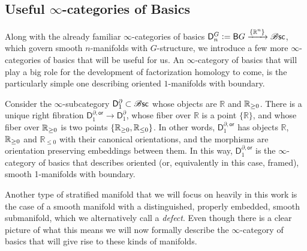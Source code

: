 \documentclass[../text]{subfiles}
\begin{document}
\subsection{Useful \texorpdfstring{$\infty$}{infinite}-categories of Basics}

Along with the already familiar $\infty$-categories of basics $\mathsf{D}_n^{G} := \mathsf{B}G \xrightarrow{\{ \mathbb{R}^n\}} \mathscr{B} \mathsf{sc}$, which govern smooth $n$-manifolds with $G$-structure, we introduce a few more $\infty$-categories of basics that will be useful for us. An $\infty$-category of basics that will play a big role for the development of factorization homology to come, is the particularly simple one describing oriented $1$-manifolds with boundary.

\begin{construction}\label{con:d_1^bor_structure}
    Consider the $\infty$-subcategory $\mathsf{D}_1^{\partial} \subset \mathscr{B} \mathsf{sc}$ whose objects are $\mathbb{R}$ and $\mathbb{R}_{\geq 0}$. There is a unique right fibration $\mathsf{D}_1^{\partial, \mathsf{or}} \rightarrow \mathsf{D}_1^{\partial}$, whose fiber over $\mathbb{R}$ is a point $\{ \mathbb{R}\}$, and whose fiber over $\mathbb{R}_{\geq 0}$ is two points $\{ \mathbb{R}_{\geq 0}, {\mathbb{R}_{\leq 0}} \}$. In other words, $\mathsf{D}_1^{\partial, \mathsf{or}}$ has objects $\mathbb{R}$, $\mathbb{R}_{\geq 0}$ and $\mathbb{R}_{\leq 0}$ with their canonical orientations, and the morphisms are orientation preserving embeddings between them. In this way, $\mathsf{D}_1^{\partial, \mathsf{or}}$ is the $\infty$-category of basics that describes oriented (or, equivalently in this case, framed), smooth 1-manifolds with boundary.
\end{construction}

Another type of stratified manifold that we will focus on heavily in this work is the case of a smooth manifold with a distinguished, properly embedded, smooth submanifold, which we alternatively call a \emph{defect}. Even though there is a clear picture of what this means we will now formally describe the $\infty$-category of basics that will give rise to these kinds of manifolds.
\end{document}
